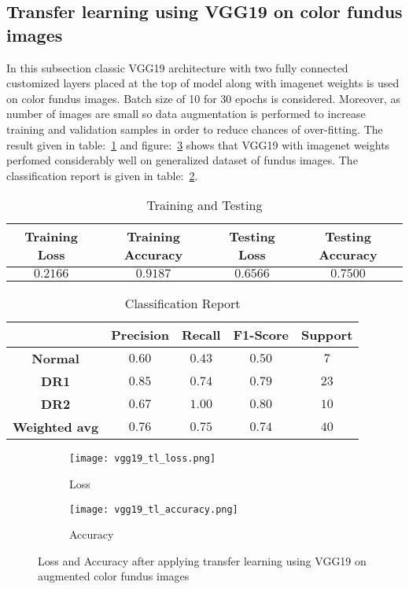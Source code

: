 \documentclass[12pt,a4paper,titlepage]{report}
\begin{document}
\subsection{Transfer learning using VGG19 on color fundus images}
In this subsection classic VGG19 architecture with two fully connected customized layers placed at the top of model along with imagenet weights is used on color fundus images. Batch size of 10 for 30 epochs is considered. Moreover, as number of images are small so data augmentation is performed to increase training and validation samples in order to reduce chances of over-fitting. The result given in table:~\ref{tab: Table-10} and figure:~\ref{fig: Image5} shows that VGG19 with imagenet weights perfomed considerably well on generalized dataset of fundus images. The classification report is given in table:~\ref{tab: Table-11}.
\vspace{30pt}
\begin{table}[H]
\centering
\caption{Training and Testing}
\label{tab: Table-10}
\begin{tabular}{c c c c}
\hline
\textbf{Training Loss} & \textbf{Training Accuracy} & \textbf{Testing Loss} & \textbf{Testing Accuracy}\\
\hline
$0.2166$ & $0.9187$ & $0.6566$ & $0.7500$\\
\hline
\end{tabular}
\end{table}
\vspace{20pt}

\begin{table}[H]
\centering
\caption{Classification Report}
\label{tab: Table-11}
\begin{tabular}{c c c c c}
\hline
\textbf{} & \textbf{Precision} & \textbf{Recall} & \textbf{F1-Score} & \textbf{Support} \\
\hline
\textbf{Normal} & $0.60$ & $0.43$ & $0.50$ & $7$\\
\textbf{DR1} & $0.85$ & $0.74$ & $0.79$ & $23$\\
\textbf{DR2} & $0.67$ & $1.00$ & $0.80$ & $10$\\
\textbf{Weighted avg} & $0.76$ & $0.75$ & $0.74$ & $40$\\
\hline
\end{tabular}
\end{table}

\begin{figure}[H]
\centering
\begin{subfigure}[h]{0.45\linewidth}
\texttt{[image: vgg19\_tl\_loss.png]}
\caption{Loss}
\label{fig:a}
\end{subfigure}
\quad
\begin{subfigure}[h]{0.45\linewidth}
\texttt{[image: vgg19\_tl\_accuracy.png]}
\caption{Accuracy}
\label{fig:b}
\end{subfigure}
\caption{Loss and Accuracy after applying transfer learning using VGG19 on augmented color fundus images}
\label{fig: Image5}
\end{figure}
\end{document}
